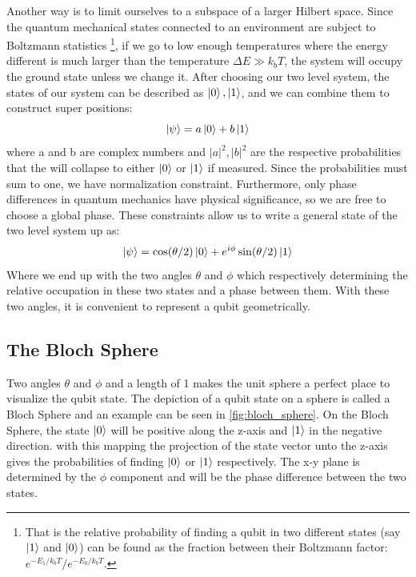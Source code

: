 Another way is to limit ourselves to a subspace of a larger Hilbert space. Since the quantum mechanical states connected to an environment are subject to Boltzmann statistics \footnote{That is the relative probability of finding a qubit in two different states (say $\ket{1}$ and $\ket{0}$) can be found as the fraction between their Boltzmann factor: $e^{-E_1 / k_b  T} / e^{- E_0 / k_b  T}$.}, if we go to low enough temperatures where the energy different is much larger than the temperature $\Delta E \gg k_b T$, the system will occupy the ground state unless we change it. After choosing our two level system, the states of our system can be described as $\ket{0}, \ket{1}$, and we can combine them to construct super positions:
\begin{equation}
    \ket{\psi} = a \ket{0} + b \ket{1}
\end{equation}
where a and b are complex numbers and $|a|^2, |b|^2$ are the respective probabilities that the will collapse to either $\ket{0}$ or $\ket{1}$ if measured. Since the probabilities must sum to one, we have normalization constraint. Furthermore, only phase differences in quantum mechanics have physical significance, so we are free to choose a global phase. These constraints allow us to write a general state of the two level system up as:
\begin{equation}\label{eq:general_2_state}
    \ket{\psi} = \cos (\theta / 2) \ket{0} + e^{i\phi}\sin(\theta / 2)\ket{1}
\end{equation}
Where we end up with the two angles $\theta$ and $\phi$ which respectively determining the relative occupation in these two states and a phase between them. With these two angles, it is convenient to represent a qubit geometrically.

\subsection{The Bloch Sphere}

Two angles $\theta$ and $\phi$ and a length of 1 makes the unit sphere a perfect place to visualize the qubit state. The depiction of a qubit state on a sphere is called a Bloch Sphere and an example can be seen in \ref{fig:bloch_sphere}. On the Bloch Sphere, the state $\ket{0}$ will be positive along the z-axis and $\ket{1}$ in the negative direction. with this mapping the projection of the state vector unto the z-axis gives the probabilities of finding $\ket{0}$ or $\ket{1}$ respectively. The x-y plane is determined by the $\phi$ component and will be the phase difference between the two states. \cite{krantz_week_2019}

